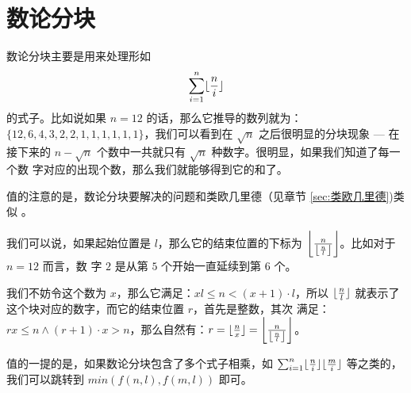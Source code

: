 \section{数论分块} \label{sec:数论分块}
数论分块主要是用来处理形如
$$
    \sum^{n}_{i=1} \lfloor{n \over i}\rfloor
$$
的式子。比如说如果 $n = 12$ 的话，那么它推导的数列就为：$\{12, 6, 4, 3, 2, 2, 1,
1, 1, 1, 1, 1\}$，我们可以看到在 $\sqrt n$ 之后很明显的分块现象 --- 在接下来的
$n - \sqrt n$ 个数中一共就只有 $\sqrt n$ 种数字。很明显，如果我们知道了每一个数
字对应的出现个数，那么我们就能够得到它的和了。

值的注意的是，数论分块要解决的问题和类欧几里德（见章节 \ref{sec:类欧几里德})类似
。

我们可以说，如果起始位置是 $l$，那么它的结束位置的下标为 $\left\lfloor\frac{n}{
\left\lfloor{n \over l}\right\rfloor}\right\rfloor$。比如对于 $n = 12$ 而言，数
字 $2$ 是从第 $5$ 个开始一直延续到第 $6$ 个。

我们不妨令这个数为 $x$，那么它满足：$xl \le n < (x + 1)\cdot l$，所以 $\lfloor{n
\over l}\rfloor$ 就表示了这个块对应的数字，而它的结束位置 $r$，首先是整数，其次
满足：$rx \le n \land (r+1)\cdot x > n$，那么自然有：$r = \lfloor{n \over
x}\rfloor = \left\lfloor\frac{n}{\left\lfloor{n \over
l}\right\rfloor}\right\rfloor$。

值的一提的是，如果数论分块包含了多个式子相乘，如 $\sum^{n}_{i=1} \lfloor{n \over
i}\rfloor\lfloor{m \over i}\rfloor$ 等之类的，我们可以跳转到 $min(f(n, l), f(m,
l))$ 即可。
